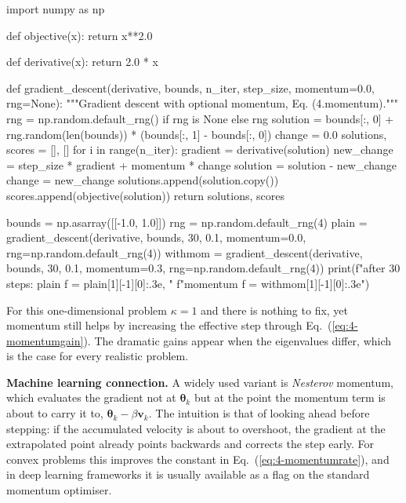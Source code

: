 \begin{Python}{}
import numpy as np

def objective(x):
    return x**2.0

def derivative(x):
    return 2.0 * x

def gradient_descent(derivative, bounds, n_iter, step_size, momentum=0.0,
                     rng=None):
    """Gradient descent with optional momentum, Eq. (4.momentum)."""
    rng = np.random.default_rng() if rng is None else rng
    solution = bounds[:, 0] + rng.random(len(bounds)) * (bounds[:, 1] - bounds[:, 0])
    change = 0.0
    solutions, scores = [], []
    for i in range(n_iter):
        gradient = derivative(solution)
        new_change = step_size * gradient + momentum * change
        solution = solution - new_change
        change = new_change
        solutions.append(solution.copy())
        scores.append(objective(solution))
    return solutions, scores


bounds = np.asarray([[-1.0, 1.0]])
rng = np.random.default_rng(4)
plain = gradient_descent(derivative, bounds, 30, 0.1, momentum=0.0,
                         rng=np.random.default_rng(4))
withmom = gradient_descent(derivative, bounds, 30, 0.1, momentum=0.3,
                           rng=np.random.default_rng(4))
print(f"after 30 steps: plain f = {plain[1][-1][0]:.3e}, "
      f"momentum f = {withmom[1][-1][0]:.3e}")
\end{Python}

For this one-dimensional problem $\kappa=1$ and there is nothing to fix, yet
momentum still helps by increasing the effective step through
Eq.~(\ref{eq:4-momentumgain}).  The dramatic gains appear when the eigenvalues
differ, which is the case for every realistic problem.

\begin{notebox}
\textbf{Machine learning connection.} A widely used variant is
\emph{Nesterov} momentum, which evaluates the gradient not at
$\bm{\theta}_k$ but at the point the momentum term is about to carry it to,
$\bm{\theta}_k-\beta\bm{v}_k$.  The intuition is that of looking ahead before
stepping: if the accumulated velocity is about to overshoot, the gradient at
the extrapolated point already points backwards and corrects the step early.
For convex problems this improves the constant in
Eq.~(\ref{eq:4-momentumrate}), and in deep learning frameworks it is usually
available as a flag on the standard momentum optimiser.
\end{notebox}

